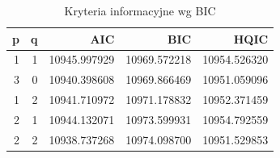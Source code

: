 \documentclass{article}
\theoremstyle{break}
\begin{document}
\begin{table}[H]
	\centering
	\begin{tabular}{|r|r|r|r|r|}
		\hline
		\rowcolor[HTML]{C0C0C0} 
		{\color[HTML]{111111} \textbf{p}} & {\color[HTML]{111111} \textbf{q}} & {\color[HTML]{111111} \textbf{AIC}} & {\color[HTML]{111111} \textbf{BIC}} & {\color[HTML]{111111} \textbf{HQIC}} \\ \hline
		\rowcolor[HTML]{FFFFFF} 
		{\color[HTML]{111111} 1}          & {\color[HTML]{111111} 1}          & {\color[HTML]{111111} 10945.997929} & {\color[HTML]{111111} 10969.572218} & {\color[HTML]{111111} 10954.526320}  \\ \hline
		\rowcolor[HTML]{FFFFFF} 
		{\color[HTML]{111111} 3}          & {\color[HTML]{111111} 0}          & {\color[HTML]{111111} 10940.398608} & {\color[HTML]{111111} 10969.866469} & {\color[HTML]{111111} 10951.059096}  \\ \hline
		\rowcolor[HTML]{FFFFFF} 
		{\color[HTML]{111111} 1}          & {\color[HTML]{111111} 2}          & {\color[HTML]{111111} 10941.710972} & {\color[HTML]{111111} 10971.178832} & {\color[HTML]{111111} 10952.371459}  \\ \hline
		\rowcolor[HTML]{FFFFFF} 
		{\color[HTML]{111111} 2}          & {\color[HTML]{111111} 1}          & {\color[HTML]{111111} 10944.132071} & {\color[HTML]{111111} 10973.599931} & {\color[HTML]{111111} 10954.792559}  \\ \hline
		\rowcolor[HTML]{FFFFFF} 
		{\color[HTML]{111111} 2}          & {\color[HTML]{111111} 2}          & {\color[HTML]{111111} 10938.737268} & {\color[HTML]{111111} 10974.098700} & {\color[HTML]{111111} 10951.529853}  \\ \hline
	\end{tabular}
\caption{Kryteria informacyjne wg BIC}
\label{t2}
\end{table}
\end{document}
